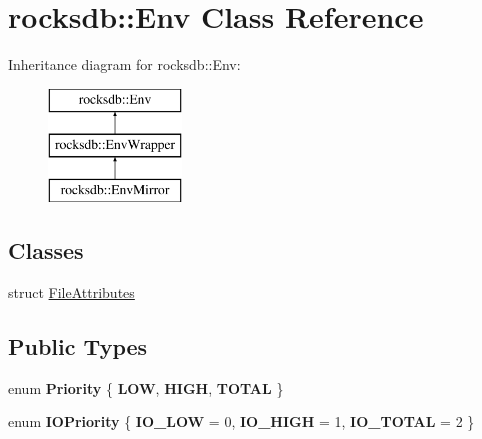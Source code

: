 \hypertarget{classrocksdb_1_1Env}{}\section{rocksdb\+:\+:Env Class Reference}
\label{classrocksdb_1_1Env}
Inheritance diagram for rocksdb\+:\+:Env\+:\begin{figure}[H]
\begin{center}
\leavevmode
\includegraphics[height=3.000000cm]{classrocksdb_1_1Env}
\end{center}
\end{figure}
\subsection*{Classes}
\begin{DoxyCompactItemize}
\item 
struct \hyperlink{structrocksdb_1_1Env_1_1FileAttributes}{File\+Attributes}
\end{DoxyCompactItemize}
\subsection*{Public Types}
\begin{DoxyCompactItemize}
\item 
enum {\bfseries Priority} \{ {\bfseries L\+OW}, 
{\bfseries H\+I\+GH}, 
{\bfseries T\+O\+T\+AL}
 \}\hypertarget{classrocksdb_1_1Env_aa5be3083441b804767a9d554d7effcda}{}\label{classrocksdb_1_1Env_aa5be3083441b804767a9d554d7effcda}

\item 
enum {\bfseries I\+O\+Priority} \{ {\bfseries I\+O\+\_\+\+L\+OW} = 0, 
{\bfseries I\+O\+\_\+\+H\+I\+GH} = 1, 
{\bfseries I\+O\+\_\+\+T\+O\+T\+AL} = 2
 \}\hypertarget{classrocksdb_1_1Env_a20ebe3b9e9fae566e83e91249a02b021}{}\label{classrocksdb_1_1Env_a20ebe3b9e9fae566e83e91249a02b021}

\end{DoxyCompactItemize}
